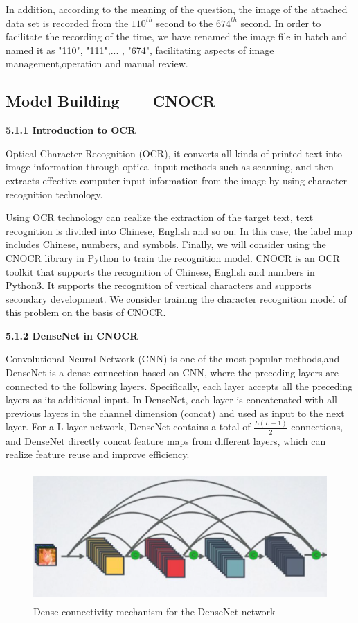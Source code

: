 \documentclass{apmcmthesis}
\begin{document}
		In addition, according to the meaning of the question, the image of the attached data set is recorded from the $110^{th}$ second to the $674^{th}$ second. In order to facilitate the recording of the time, we have renamed the image file in batch and named it as "110", "111",... , "674", facilitating aspects of image management,operation and manual review.
		
		
\subsection{Model Building——CNOCR}
	
	   \noindent\textbf{5.1.1 Introduction to OCR }  
		
		Optical Character Recognition (OCR), it converts all kinds of printed text into image information through optical input methods such as scanning, and then extracts effective computer input information from the image by using character recognition technology.
		
		Using OCR technology can realize the extraction of the target text, text recognition is divided into Chinese, English and so on. In this case, the label map includes Chinese, numbers, and symbols. Finally, we will consider using the CNOCR library in Python to train the recognition model. CNOCR is an OCR toolkit that supports the recognition of Chinese, English and numbers in Python3. It supports the recognition of vertical characters and supports secondary development. We consider training the character recognition model of this problem on the basis of CNOCR.
		
		\noindent\textbf{5.1.2 DenseNet in CNOCR}  
		
		Convolutional Neural Network (CNN) is one of the most popular methods,and DenseNet is a dense connection based on CNN, where the preceding layers are connected to the following layers. Specifically, each layer accepts all the preceding layers as its additional input. In DenseNet, each layer is concatenated with all previous layers in the channel dimension (concat) and used as input to the next layer. For a L-layer network, DenseNet contains a total of $\frac{L(L+1)}{2}$ connections, and DenseNet directly concat feature maps from different layers, which can realize feature reuse and improve efficiency.
		
			
		\begin{figure}[htbp!]
		\centering
		\includegraphics[height=5cm]{./figures/5-6.png}
		\caption{Dense connectivity mechanism for the DenseNet network}
		\label{fig:8}
		\end{figure}
	
\end{document}
